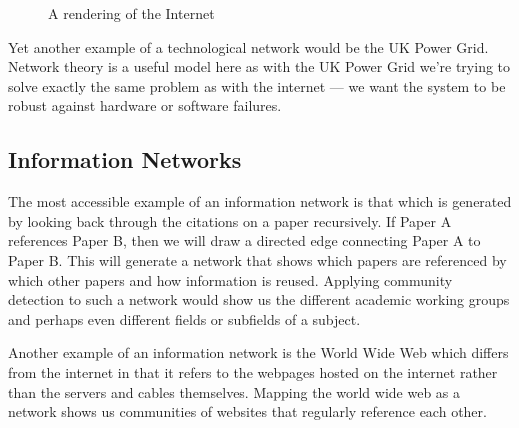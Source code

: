 \begin{figure}
    \begin{center}
    \end{center}
    \caption{A rendering of the Internet}
    \label{fig:internet}
\end{figure}

Yet another example of a technological network would be the UK Power Grid. Network theory is a useful model here as with the UK Power Grid we're trying to solve exactly the same problem as with the internet --- we want the system to be robust against hardware or software failures.

\subsection{Information Networks}\label{sec:Information Networks}
The most accessible example of an information network is that which is generated by looking back through the citations on a paper recursively. If Paper A references Paper B, then we will draw a directed edge connecting Paper A to Paper B. This will generate a network that shows which papers are referenced by which other papers and how information is reused. Applying community detection to such a network would show us the different academic working groups and perhaps even different fields or subfields of a subject.

Another example of an information network is the World Wide Web which differs from the internet in that it refers to the webpages hosted on the internet rather than the servers and cables themselves. Mapping the world wide web as a network shows us communities of websites that regularly reference each other.
